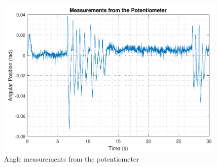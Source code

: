 \begin{figure}[H]
	\includegraphics[scale=.75]{figures/potData}
	\centering
	\caption{Angle measurements from the potentiometer}
\end{figure} \label{potData}
